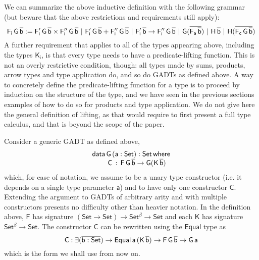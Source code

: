 \documentclass[acmsmall,screen,review,anonymous]{acmart}
\theoremstyle{definition}
\begin{document}
We can summarize the above inductive definition with the following grammar
(but beware that the above restrictions and requirements still apply):
\[
\mathsf{F_i\,G\,\overline{b} :=
F_i'\,G\,\overline{b} \times F_i''\,G\,\overline{b}
\ \vert\ F_i'\,G\,\overline{b} + F_i''\,G\,\overline{b}
\ \vert\ F_i'\,\overline{b} \to F_i''\,G\,\overline{b}
\ \vert\ G(\overline{F_a\,\overline{b}})
\ \vert\ H\,\overline{b}
\ \vert\ H (\overline{F_c\,G\,\overline{b}})
}
\]
A further requirement that applies to all of the types appearing above,
including the types $\mathsf{K_i}$,
is that every type needs to have a predicate-lifting function.
This is not an overly restrictive condition, though:
all types made by sums, products, arrow types and type application do, and so do GADTs as defined above.
A way to concretely define the predicate-lifting function for a type is to proceed by induction on the structure of the type,
and we have seen in the previous sections examples of how to do so for products and type application.
We do not give here the general definition of lifting,
as that would require to first present a full type calculus,
and that is beyond the scope of the paper.


Consider a generic GADT as defined above,
\begin{equation}\label{eq:gadt}
\begin{array}{l}
\mathsf{data\, G\,(a : Set) : Set\,where}\\
\mathsf{\;\;\;\;\;\;\;\;C\, :\, F\,G\,\overline{b} \to G (K\,\overline{b})}
\end{array}
\end{equation}
which, for ease of notation,
we assume to be a unary type constructor (i.e. it depends on a single type parameter $\mathsf{a}$)
and to have only one constructor $\mathsf{C}$.
Extending the argument to GADTs of arbitrary arity and with multiple constructors presents no difficulty
other than heavier notation.
In the definition above, $\mathsf{F}$ has signature $\mathsf{(Set \to Set) \to Set^{\beta} \to Set}$
and each $\mathsf{K}$ has signature $\mathsf{Set^{\beta} \to Set}$.
The constructor $\mathsf{C}$ can be rewritten using the $\mathsf{Equal}$ type as
\[
\mathsf{C : \exists (\overline{b : Set}) \to Equal\,a\,(K\,\overline{b}) \to F\,G\,\overline{b} \to G\,a}
\]
which is the form we shall use from now on.
\end{document}
